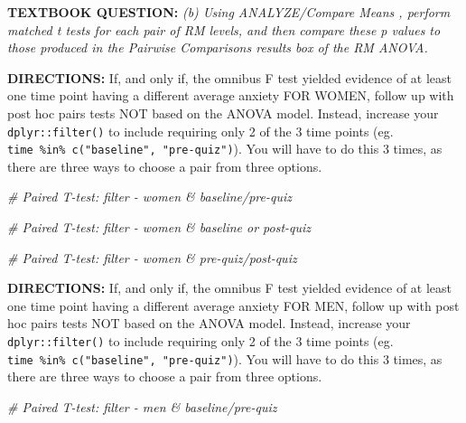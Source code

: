 \documentclass[]{article}
\newenvironment{Shaded}{\begin{snugshade}}{\end{snugshade}}
\newcommand{\CommentTok}[1]{\textcolor[rgb]{0.56,0.35,0.01}{\textit{#1}}}
\begin{document}
\textbf{TEXTBOOK QUESTION:} \emph{(b) Using ANALYZE/Compare Means ,
perform matched t tests for each pair of RM levels, and then compare
these p values to those produced in the Pairwise Comparisons results box
of the RM ANOVA.}

\textbf{DIRECTIONS:} If, and only if, the omnibus F test yielded
evidence of at least one time point having a different average anxiety
FOR WOMEN, follow up with post hoc pairs tests NOT based on the ANOVA
model. Instead, increase your \texttt{dplyr::filter()} to include
requiring only 2 of the 3 time points (eg.
\texttt{time\ \%in\%\ c("baseline",\ "pre-quiz")}). You will have to do
this 3 times, as there are three ways to choose a pair from three
options.

\begin{Shaded}
\begin{Highlighting}[]
\CommentTok{# Paired T-test: filter - women & baseline/pre-quiz}
\end{Highlighting}
\end{Shaded}

\begin{Shaded}
\begin{Highlighting}[]
\CommentTok{# Paired T-test: filter - women & baseline or post-quiz}
\end{Highlighting}
\end{Shaded}

\begin{Shaded}
\begin{Highlighting}[]
\CommentTok{# Paired T-test: filter - women & pre-quiz/post-quiz}
\end{Highlighting}
\end{Shaded}

\clearpage

\textbf{DIRECTIONS:} If, and only if, the omnibus F test yielded
evidence of at least one time point having a different average anxiety
FOR MEN, follow up with post hoc pairs tests NOT based on the ANOVA
model. Instead, increase your \texttt{dplyr::filter()} to include
requiring only 2 of the 3 time points (eg.
\texttt{time\ \%in\%\ c("baseline",\ "pre-quiz")}). You will have to do
this 3 times, as there are three ways to choose a pair from three
options.

\begin{Shaded}
\begin{Highlighting}[]
\CommentTok{# Paired T-test: filter - men & baseline/pre-quiz}
\end{Highlighting}
\end{Shaded}
\end{document}
